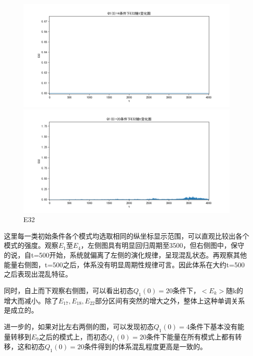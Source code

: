 \documentclass[10pt, a4paper]{article}
\begin{document}
    \begin{figure}[H]
        \begin{minipage}[t]{0.49\textwidth}
            \centering
            \includegraphics[width=\textwidth]{./q5_pics/cmp/E32.png}
        \end{minipage}
        \begin{minipage}[t]{0.49\textwidth}
            \centering
            \includegraphics[width=\textwidth]{./q5_pics/exp/E32.png}
        \end{minipage}
        \caption{E32}\label{fig:E32 in q5}
    \end{figure}

    这里每一类初始条件各个模式均选取相同的纵坐标显示范围，可以直观比较出各个模式的强度。观察$E_1$至$E_4$，左侧图具有明显回归周期至3500，但右侧图中，保守的说，自t=500开始，系统就偏离了左侧的演化规律，呈现混乱状态。再观察其他能量右侧图，t=500之后，体系没有明显周期性规律可言。因此体系在大约t=500之后表现出混乱特征。

    同时，自上而下观察右侧图，可以看出初态$Q_1(0)=20$条件下，$<E_k>$随k的增大而减小。除了$E_{17},E_{18},E_{22}$部分区间有突然的增大之外，整体上这种单调关系是成立的。

    进一步的，如果对比左右两侧的图，可以发现初态$Q_1(0)=4$条件下基本没有能量转移到$E_9$之后的模式上，而初态$Q_1(0)=20$条件下能量在所有模式上都有转移，这和初态$Q_1(0)=20$条件得到的体系混乱程度更高是一致的。
\end{document}

